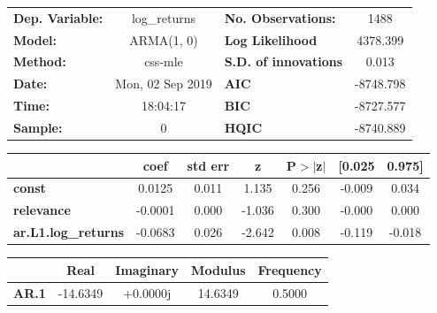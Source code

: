 \begin{center}
\begin{tabular}{lclc}
\toprule
\textbf{Dep. Variable:}     &        log\_returns       & \textbf{  No. Observations:  } &            1488            \\
\textbf{Model:}             &         ARMA(1, 0)        & \textbf{  Log Likelihood     } &          4378.399          \\
\textbf{Method:}            &          css-mle          & \textbf{  S.D. of innovations} &           0.013            \\
\textbf{Date:}              &      Mon, 02 Sep 2019     & \textbf{  AIC                } &         -8748.798          \\
\textbf{Time:}              &          18:04:17         & \textbf{  BIC                } &         -8727.577          \\
\textbf{Sample:}            &             0             & \textbf{  HQIC               } &         -8740.889          \\
\bottomrule
\end{tabular}
\begin{tabular}{lcccccc}
                            & \textbf{coef} & \textbf{std err} & \textbf{z} & \textbf{P$> |$z$|$} & \textbf{[0.025} & \textbf{0.975]}  \\
\midrule
\textbf{const}              &       0.0125  &        0.011     &     1.135  &         0.256        &       -0.009    &        0.034     \\
\textbf{relevance}          &      -0.0001  &        0.000     &    -1.036  &         0.300        &       -0.000    &        0.000     \\
\textbf{ar.L1.log\_returns} &      -0.0683  &        0.026     &    -2.642  &         0.008        &       -0.119    &       -0.018     \\
\bottomrule
\end{tabular}
\begin{tabular}{lcccc}
              & \textbf{            Real} & \textbf{         Imaginary} & \textbf{         Modulus} & \textbf{        Frequency}  \\
\midrule
\textbf{AR.1} &              -14.6349     &                +0.0000j     &               14.6349     &                0.5000       \\
\bottomrule
\end{tabular}
\end{center}
